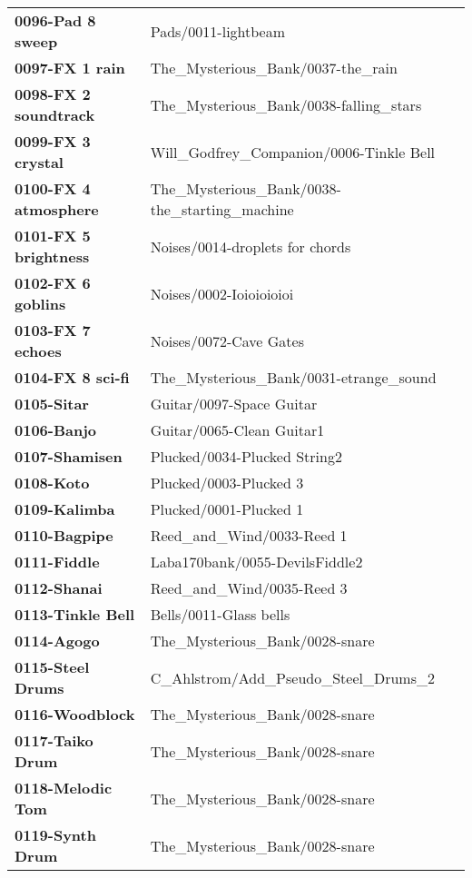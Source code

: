 \begin{longtable}{|l l|}
   \textbf{0096-Pad 8 sweep} &
      Pads/0011-lightbeam \\
   \textbf{0097-FX 1 rain} &
      The\_Mysterious\_Bank/0037-the\_rain \\
   \textbf{0098-FX 2 soundtrack} &
      The\_Mysterious\_Bank/0038-falling\_stars \\
   \textbf{0099-FX 3 crystal} &
      Will\_Godfrey\_Companion/0006-Tinkle Bell \\
   \textbf{0100-FX 4 atmosphere} &
      The\_Mysterious\_Bank/0038-the\_starting\_machine \\
   \textbf{0101-FX 5 brightness} &
      Noises/0014-droplets for chords \\
   \textbf{0102-FX 6 goblins} &
      Noises/0002-Ioioioioioi \\
   \textbf{0103-FX 7 echoes} &
      Noises/0072-Cave Gates \\
   \textbf{0104-FX 8 sci-fi} &
      The\_Mysterious\_Bank/0031-etrange\_sound \\
   \textbf{0105-Sitar} &
      Guitar/0097-Space Guitar \\
   \textbf{0106-Banjo} &
      Guitar/0065-Clean Guitar1 \\
   \textbf{0107-Shamisen} &
      Plucked/0034-Plucked String2 \\
   \textbf{0108-Koto} &
      Plucked/0003-Plucked 3 \\
   \textbf{0109-Kalimba} &
      Plucked/0001-Plucked 1 \\
   \textbf{0110-Bagpipe} &
      Reed\_and\_Wind/0033-Reed 1 \\
   \textbf{0111-Fiddle} &
      Laba170bank/0055-DevilsFiddle2 \\
   \textbf{0112-Shanai} &
      Reed\_and\_Wind/0035-Reed 3 \\
   \textbf{0113-Tinkle Bell} &
      Bells/0011-Glass bells \\
   \textbf{0114-Agogo} &
      The\_Mysterious\_Bank/0028-snare \\
   \textbf{0115-Steel Drums} &
      C\_Ahlstrom/Add\_Pseudo\_Steel\_Drums\_2 \\
   \textbf{0116-Woodblock} &
      The\_Mysterious\_Bank/0028-snare \\
   \textbf{0117-Taiko Drum} &
      The\_Mysterious\_Bank/0028-snare \\
   \textbf{0118-Melodic Tom} &
      The\_Mysterious\_Bank/0028-snare \\
   \textbf{0119-Synth Drum} &
      The\_Mysterious\_Bank/0028-snare \\

\end{longtable}
